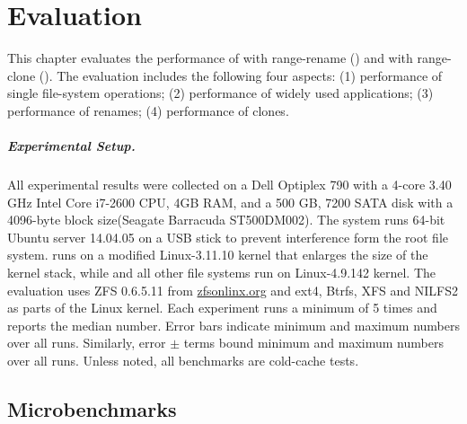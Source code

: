 \chapter{Evaluation}
\label{chap:eval}

This chapter evaluates the performance of \betrfs with
range-rename (\betrfsFour) and \betrfs with range-clone (\betrfsFive).
The evaluation includes the following four aspects:
(1) performance of single file-system operations;
(2) performance of widely used applications;
(3) performance of renames;
(4) performance of clones.

\paragraph{Experimental Setup.}

All experimental results were collected on
a Dell Optiplex 790 with a 4-core 3.40 GHz Intel Core i7-2600 CPU,
4GB RAM,
and a 500 GB, 7200 SATA disk with a 4096-byte block size(Seagate Barracuda ST500DM002).
The system runs 64-bit Ubuntu server 14.04.05 on a USB stick to prevent
interference form the root file system.
\betrfsFour runs on a modified Linux-3.11.10 kernel that enlarges the size of the kernel stack,
while \betrfsFive and all other file systems run on Linux-4.9.142 kernel.
The evaluation uses ZFS 0.6.5.11 from \url{zfsonlinx.org} and
ext4, Btrfs, XFS and NILFS2 as parts of the Linux kernel.
Each experiment runs a minimum of 5 times and reports the median number.
Error bars indicate minimum and maximum numbers over all runs.
Similarly, error $\pm$ terms bound minimum and maximum numbers over all runs.
Unless noted, all benchmarks are cold-cache tests.

\section{Microbenchmarks}

\newcommand{\addSeqPlot}[1]{
    \addplot[
        discard if not={fs}{#1},
        fill=\pgfkeysvalueof{/fs-colors/#1},
        nodes near coords=\pgfkeysvalueof{/fs-names/#1},
    ]
    plot[
        error bars/.cd,
        y dir=both, y explicit,
    ]
    table[
        x=op,
        y=median,
        y error plus expr=\thisrow{max}-\thisrow{median},
        y error minus expr=\thisrow{median}-\thisrow{min},
    ]
    {./data/seq_io.csv};
}

